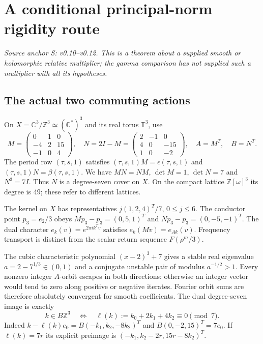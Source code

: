 \section{A conditional principal-norm rigidity route}\label{sec:rigidity}
\noindent\textit{Source anchor S: v0.10--v0.12. This is a theorem about a supplied smooth or holomorphic relative multiplier; the gamma comparison has not supplied such a multiplier with all its hypotheses.}

\subsection{The actual two commuting actions}
On $X=\mathbb C^3/\mathbb Z^3\simeq(\mathbb C^*)^3$ and its real torus $\mathbb T^3$, use
\[
 M=\begin{pmatrix}0&1&0\\-4&2&15\\-1&0&4\end{pmatrix},\quad
 N=2I-M=\begin{pmatrix}2&-1&0\\4&0&-15\\1&0&-2\end{pmatrix},\quad
 A=M^T,\quad B=N^T.
\]
The period row $(\tau,s,1)$ satisfies $(\tau,s,1)M=\epsilon(\tau,s,1)$ and $(\tau,s,1)N=\beta(\tau,s,1)$. We have $MN=NM$, $\det M=1$, $\det N=7$ and $N^3=7I$. Thus $N$ is a degree-seven cover on $X$. On the compact lattice $\mathbb Z[\omega]^3$ its degree is 49; these refer to different lattices.

The kernel on $X$ has representatives $j(1,2,4)^T/7$, $0\le j\le6$. The conductor point $p_3=e_2/3$ obeys $Mp_3-p_3=(0,5,1)^T$ and $Np_3-p_3=(0,-5,-1)^T$. The dual character $e_k(v)=e^{2\pi ik^Tv}$ satisfies $e_k(Mv)=e_{Ak}(v)$. Frequency transport is distinct from the scalar return sequence $F(\rho^m/3)$.

The cubic characteristic polynomial $(x-2)^3+7$ gives a stable real eigenvalue $a=2-7^{1/3}\in(0,1)$ and a conjugate unstable pair of modulus $a^{-1/2}>1$. Every nonzero integer $A$-orbit escapes in both directions: otherwise an integer vector would tend to zero along positive or negative iterates. Fourier orbit sums are therefore absolutely convergent for smooth coefficients. The dual degree-seven image is exactly
\[
 k\in B\mathbb Z^3\quad\Longleftrightarrow\quad
 \ell(k):=k_0+2k_1+4k_2\equiv0\pmod7.
\]
Indeed $k-\ell(k)e_0=B(-k_1,k_2,-8k_2)^T$ and $B(0,-2,15)^T=7e_0$. If $\ell(k)=7r$ its explicit preimage is $(-k_1,k_2-2r,15r-8k_2)^T$.

